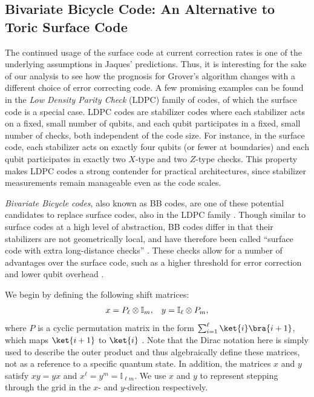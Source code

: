 \subsection{Bivariate Bicycle Code: An Alternative to Toric Surface Code}\label{sec:bb_code}
The continued usage of the surface code at current correction rates is one of the underlying assumptions in Jaques' predictions. 
Thus, it is interesting for the sake of our analysis to see how the prognosis for Grover's algorithm changes with a different choice of error correcting code. A few promising examples can be found in the \emph{Low Density Parity Check} (LDPC) family of codes, of which the surface code is a special case. LDPC codes are stabilizer codes where each stabilizer acts on a fixed, small number of qubits, and each qubit participates in a fixed, small number of checks, both independent of the code size. For instance, in the surface code, each stabilizer acts on exactly four qubits (or fewer at boundaries) and each qubit participates in exactly two $X$-type and two $Z$-type checks. This property makes LDPC codes a strong contender for practical architectures, since stabilizer measurements remain manageable even as the code scales.

\emph{Bivariate Bicycle codes}, also known as BB codes, are one of these potential candidates to replace surface codes, also in the LDPC family \cite{Bravyi2024}. Though similar to surface codes at a high level of abstraction, BB codes differ in that their stabilizers are not geometrically local, and have therefore been called ``surface code with extra long-distance checks'' \cite{sommerstudentNSM}. These checks allow for a number of advantages over the surface code, such as a higher threshold for error correction and lower qubit overhead \cite{Bravyi2024}. 

We begin by defining the following shift matrices:
\[x = P_{\ell} \otimes \mathbb{I}_m, \hspace{0.3cm} y = \mathbb{I}_{\ell} \otimes P_{m},\]
where $P$ is a cyclic permutation matrix in the form $\sum_{i=1}^{\ell} \ket{i}\bra{i+1}$, which maps $\ket{i+1}$ to $\ket{i}$ \cite{sommerstudentNSM}. Note that the Dirac notation here is simply used to describe the outer product and thus algebraically define these matrices, not as a reference to a specific quantum state. In addition, the matrices $x$ and $y$ satisfy $xy = yx$ and $x^{\ell} = y^m = \mathbb{I}_{\ell m}$. We use $x$ and $y$ to represent stepping through the grid in the $x$- and $y$-direction respectively.

